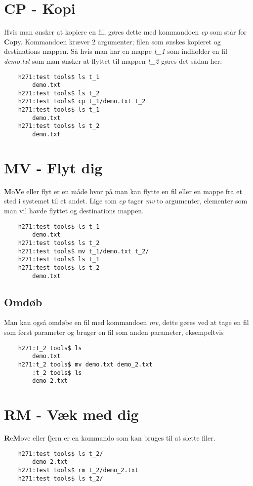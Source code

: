 \section{CP - Kopi}
Hvis man ønsker at kopiere en fil, gøres dette med kommandoen \textit{cp} som står for \textbf{C}o\textbf{p}y. Kommandoen kræver 2 argumenter; filen som ønskes kopieret og destinations mappen. Så hvis man har en mappe \textit{t\_1} som indholder en fil \textit{demo.txt} som man ønsker at flyttet til mappen \textit{t\_2} gøres det sådan her:
\begin{lstlisting}
	h271:test tools$ ls t_1
        demo.txt
	h271:test tools$ ls t_2
	h271:test tools$ cp t_1/demo.txt t_2
	h271:test tools$ ls t_1
        demo.txt
	h271:test tools$ ls t_2
        demo.txt
\end{lstlisting}
\section{MV - Flyt dig}
\textbf{M}o\textbf{V}e eller flyt er en måde hvor på man kan flytte en fil eller en mappe fra et sted i systemet til et andet. Lige som \textit{cp} tager \textit{mv} to argumenter, elementer som man vil havde flyttet og destinations mappen. 
\begin{lstlisting}
	h271:test tools$ ls t_1
        demo.txt
	h271:test tools$ ls t_2
	h271:test tools$ mv t_1/demo.txt t_2/
	h271:test tools$ ls t_1
	h271:test tools$ ls t_2
        demo.txt
\end{lstlisting}
\subsection*{Omdøb}
Man kan også omdøbe en fil med kommandoen \textit{mv}, dette gøres ved at tage en fil som først parameter og bruger en fil som anden parameter, eksempeltvis
\begin{lstlisting}
	h271:t_2 tools$ ls
        demo.txt
	h271:t_2 tools$ mv demo.txt demo_2.txt 
        :t_2 tools$ ls
        demo_2.txt
\end{lstlisting}
\section{RM - Væk med dig}
\textbf{R}e\textbf{M}ove eller fjern er en kommando som kan bruges til at slette filer. 
\begin{lstlisting}
	h271:test tools$ ls t_2/
        demo_2.txt
	h271:test tools$ rm t_2/demo_2.txt 
	h271:test tools$ ls t_2/
\end{lstlisting}
